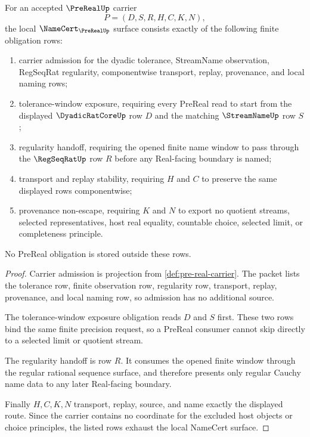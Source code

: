\begin{theorem}
\label{thm:pre-real-namecert-obligations}
For an accepted $\PreRealUp$ carrier
$$
P=(D,S,R,H,C,K,N),
$$
the local $\NameCert_{\PreRealUp}$ surface consists exactly of the following
finite obligation rows:
\begin{enumerate}
\item carrier admission for the dyadic tolerance, StreamName observation,
RegSeqRat regularity, componentwise transport, replay, provenance, and local
naming rows;
\item tolerance-window exposure, requiring every PreReal read to start from the
displayed $\DyadicRatCoreUp$ row $D$ and the matching $\StreamNameUp$ row $S$;
\item regularity handoff, requiring the opened finite name window to pass
through the $\RegSeqRatUp$ row $R$ before any Real-facing boundary is named;
\item transport and replay stability, requiring $H$ and $C$ to preserve the
same displayed rows componentwise;
\item provenance non-escape, requiring $K$ and $N$ to export no quotient
streams, selected representatives, host real equality, countable choice,
selected limit, or completeness principle.
\end{enumerate}
No PreReal obligation is stored outside these rows.
\end{theorem}
\begin{proof}
Carrier admission is projection from \autoref{def:pre-real-carrier}. The
packet lists the tolerance row, finite observation row, regularity row,
transport, replay, provenance, and local naming row, so admission has no
additional source.

The tolerance-window exposure obligation reads $D$ and $S$ first. These two
rows bind the same finite precision request, so a PreReal consumer cannot skip
directly to a selected limit or quotient stream.

The regularity handoff is row $R$. It consumes the opened finite window through
the regular rational sequence surface, and therefore presents only regular
Cauchy name data to any later Real-facing boundary.

Finally $H,C,K,N$ transport, replay, source, and name exactly the displayed
route. Since the carrier contains no coordinate for the excluded host objects
or choice principles, the listed rows exhaust the local NameCert surface.
\end{proof}

